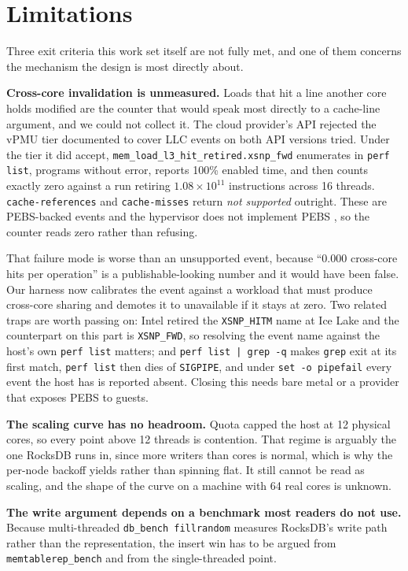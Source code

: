 \documentclass[conference]{IEEEtran}
\begin{document}
\section{Limitations}

Three exit criteria this work set itself are not fully met, and one of them
concerns the mechanism the design is most directly about.

\textbf{Cross-core invalidation is unmeasured.} Loads that hit a line another core
holds modified are the counter that would speak most directly to a cache-line
argument, and we could not collect it. The cloud provider's API rejected the vPMU
tier documented to cover LLC events on both API versions tried. Under the tier it
did accept, \texttt{mem\_load\_l3\_hit\_retired.xsnp\_fwd} enumerates in
\texttt{perf list}, programs without error, reports 100\% enabled time, and then
counts exactly zero against a run retiring $1.08 \times 10^{11}$ instructions
across 16 threads. \texttt{cache-references} and \texttt{cache-misses} return
\emph{not supported} outright. These are PEBS-backed events and the hypervisor
does not implement PEBS \cite{intel-sdm}, so the counter reads zero rather than
refusing.

That failure mode is worse than an unsupported event, because ``0.000 cross-core
hits per operation'' is a publishable-looking number and it would have been false.
Our harness now calibrates the event against a workload that must produce
cross-core sharing and demotes it to unavailable if it stays at zero. Two related
traps are worth passing on: Intel retired the \texttt{XSNP\_HITM} name at Ice Lake
and the counterpart on this part is \texttt{XSNP\_FWD}, so resolving the event
name against the host's own \texttt{perf list} matters; and \texttt{perf list |
grep -q} makes \texttt{grep} exit at its first match, \texttt{perf list} then dies
of \texttt{SIGPIPE}, and under \texttt{set -o pipefail} every event the host has is
reported absent. Closing this needs bare metal or a provider that exposes PEBS to
guests.

\textbf{The scaling curve has no headroom.} Quota capped the host at 12 physical
cores, so every point above 12 threads is contention. That regime is arguably the
one RocksDB runs in, since more writers than cores is normal, which is why the
per-node backoff yields rather than spinning flat. It still cannot be read as
scaling, and the shape of the curve on a machine with 64 real cores is unknown.

\textbf{The write argument depends on a benchmark most readers do not use.}
Because multi-threaded \texttt{db\_bench fillrandom} measures RocksDB's write path
rather than the representation, the insert win has to be argued from
\texttt{memtablerep\_bench} and from the single-threaded point.
\end{document}
